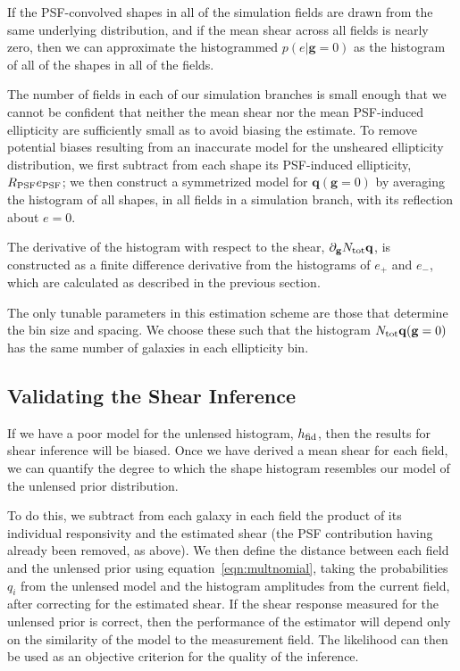 \documentclass[iop]{emulateapj}
\newcommand\rmcomment[1]{\textcolor{red}{(RM: #1)}}
\begin{document}
If the PSF-convolved shapes in all of the simulation fields are drawn
from the same underlying distribution, and if the mean shear across
all fields is nearly zero, then we can approximate the histogrammed
$p(e|\mathbf{g}=0)$ as the histogram of all of the shapes in all of the
fields.

The number of fields in each of our simulation branches is small
enough that we cannot be confident that neither the mean shear nor the
mean PSF-induced ellipticity are sufficiently small as to avoid
biasing the estimate. To remove potential biases resulting from an
inaccurate model for the unsheared ellipticity distribution, we first
subtract from each shape its PSF-induced ellipticity,
$R_{\rm PSF}e_{\rm PSF}$; we then construct a symmetrized model for
$\mathbf{q}(\mathbf{g} = 0)$ by averaging the histogram of all shapes, in all
fields in a simulation branch, with its reflection about $e=0$.

The derivative of the histogram with respect to the shear,
$\partial_{\mathbf{g}} N_{\rm tot} \mathbf{q}$, is constructed as a finite difference
derivative from the histograms of $e_+$ and $e_-$, which are
calculated as described in the previous section.

The only tunable parameters in this estimation scheme are those that
determine the bin size and spacing. We choose these such that the
histogram $N_{\rm tot} \mathbf{q} (\mathbf{g}=0)$ has the same number
of galaxies in each ellipticity bin.


\subsection{Validating the Shear Inference}
\label{sec:model_checking}


If we have a poor model for the unlensed histogram, $h_{\rm fid}$,
then the results for shear inference will be biased. Once we have derived a mean shear for
each field, we can quantify the degree to which the shape histogram
resembles our model of the unlensed prior distribution.

To do this, we subtract from each galaxy in each field the product of
its individual responsivity and the estimated shear (the PSF
contribution having already been removed, as above). We then define
the distance between each field and the unlensed prior using
equation~\ref{eqn:multnomial}, taking the probabilities $q_i$ from the
unlensed model and the histogram amplitudes from the current field,
after correcting for the estimated shear. If the shear response
measured for the unlensed prior is correct, then the performance of
the estimator will depend only on the similarity of the model to the
measurement field. The likelihood can then be used as an objective
criterion for the quality of the inference.
\end{document}
